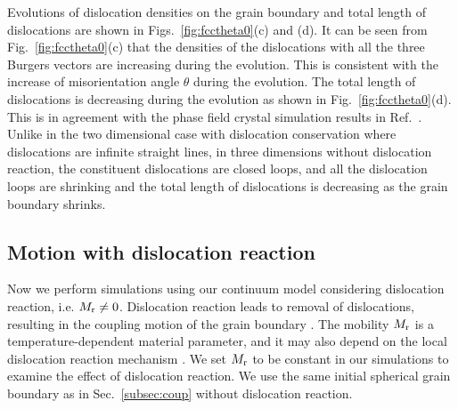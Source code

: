 Evolutions of dislocation densities on the grain boundary and total length of dislocations are shown in Figs.~\ref{fig:fcctheta0}(c) and (d). It can be seen from Fig.~\ref{fig:fcctheta0}(c) that the densities of the dislocations with all the three Burgers vectors are increasing during the evolution. This is consistent with the increase of misorientation angle $\theta$ during the evolution.
The total length of dislocations is decreasing during the evolution as shown in Fig.~\ref{fig:fcctheta0}(d). This is in agreement with the phase field crystal simulation results in Ref.~\cite{yamanaka2017phase}.
Unlike in the two dimensional case with dislocation conservation \cite{srinivasan2002challenging,cahn2004unified,trautt2012grain,wu2012phase,zhang2018motion,zhang2019new} where dislocations are infinite straight lines, in three dimensions without dislocation reaction, the constituent dislocations are closed loops,
 and all the dislocation loops are shrinking and the total length of dislocations is decreasing as the grain boundary shrinks.


\subsection{Motion with dislocation reaction}\label{subsec:fccreact}

Now we perform simulations using our continuum model considering dislocation reaction, i.e. $M_{\rm r}\neq 0$. Dislocation reaction leads to removal of dislocations,  resulting in the coupling motion of the grain boundary \cite{srinivasan2002challenging,cahn2004unified,trautt2012grain,yamanaka2017phase,zhang2018motion,zhang2019new}. The mobility $M_{\rm r}$ is a temperature-dependent material parameter, and it may also depend on the local dislocation reaction mechanism \cite{trautt2012grain,yamanaka2017phase}. We set $M_{\rm r}$ to be constant in our simulations to examine the effect of dislocation reaction. We use the same initial spherical grain boundary as in Sec.~\ref{subsec:coup} without dislocation reaction.

